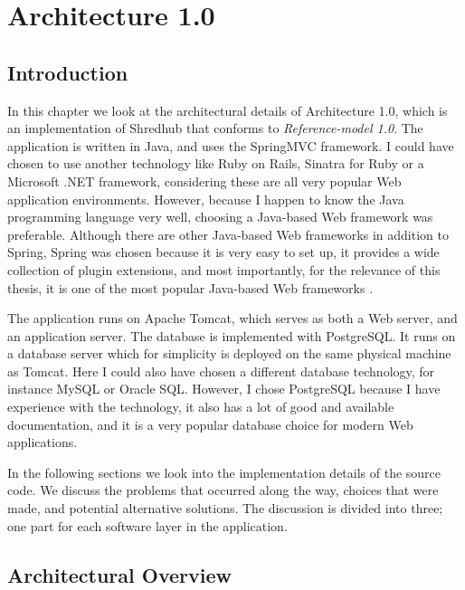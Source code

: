 \chapter{Architecture 1.0}

	
\section{Introduction}
In this chapter we look at the architectural details of Architecture 1.0, which is an implementation of Shredhub that conforms to \textit{Reference-model 1.0}. The application is written in Java, and uses the SpringMVC framework. I could have chosen to use another technology like Ruby on Rails, Sinatra for Ruby or a Microsoft .NET framework, considering these are all very popular Web application environments. However, because I happen to know the Java programming language very well, choosing a Java-based Web framework was preferable. Although there are other Java-based Web frameworks in addition to Spring, Spring was chosen because it is very easy to set up, it provides a wide collection of plugin extensions, and most importantly, for the relevance of this thesis, it is one of the most popular Java-based Web frameworks \cite{popFrameworks}.

The application runs on Apache Tomcat, which serves as both a Web server, and an application server. The database is implemented with PostgreSQL. It runs on a database server which for simplicity is deployed on the same physical machine as Tomcat. Here I could also have chosen a different database technology, for instance MySQL or Oracle SQL. However, I chose PostgreSQL because I have experience with the technology, it also has a lot of good and available documentation, and it is a very popular database choice for modern Web applications\cite{popularDB}.


In the following sections we look into the implementation details of the source code. We discuss the problems that occurred along the way, choices that were made, and potential alternative solutions. The discussion is divided into three; one part for each software layer in the application.


\section{Architectural Overview}

